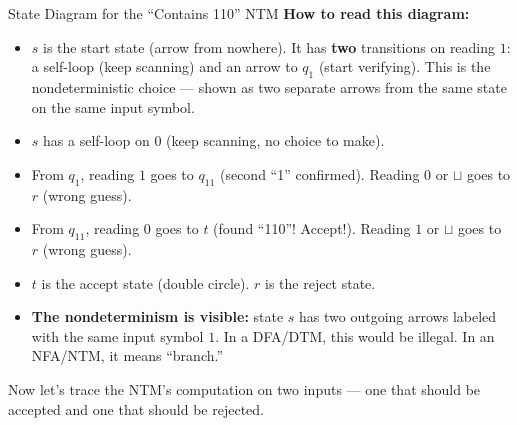 \begin{examplebox}{State Diagram for the ``Contains 110'' NTM}
\textbf{How to read this diagram:}
\begin{itemize}[nosep]
\item $s$ is the start state (arrow from nowhere). It has \textbf{two}
  transitions on reading $1$: a self-loop (keep scanning) and an arrow to $q_1$
  (start verifying). This is the nondeterministic choice --- shown as two
  separate arrows from the same state on the same input symbol.
\item $s$ has a self-loop on $0$ (keep scanning, no choice to make).
\item From $q_1$, reading $1$ goes to $q_{11}$ (second ``1'' confirmed).
  Reading $0$ or $\sqcup$ goes to $r$ (wrong guess).
\item From $q_{11}$, reading $0$ goes to $t$ (found ``110''! Accept!).
  Reading $1$ or $\sqcup$ goes to $r$ (wrong guess).
\item $t$ is the accept state (double circle). $r$ is the reject state.
\item \textbf{The nondeterminism is visible:} state $s$ has two outgoing arrows
  labeled with the same input symbol $1$. In a DFA/DTM, this would be illegal.
  In an NFA/NTM, it means ``branch.''
\end{itemize}
\end{examplebox}

Now let's trace the NTM's computation on two inputs --- one that should be
accepted and one that should be rejected.

